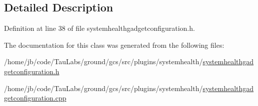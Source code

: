 \subsection{\-Detailed \-Description}


\-Definition at line 38 of file systemhealthgadgetconfiguration.\-h.



\-The documentation for this class was generated from the following files\-:\begin{DoxyCompactItemize}
\item 
/home/jb/code/\-Tau\-Labs/ground/gcs/src/plugins/systemhealth/\hyperlink{systemhealthgadgetconfiguration_8h}{systemhealthgadgetconfiguration.\-h}\item 
/home/jb/code/\-Tau\-Labs/ground/gcs/src/plugins/systemhealth/\hyperlink{systemhealthgadgetconfiguration_8cpp}{systemhealthgadgetconfiguration.\-cpp}\end{DoxyCompactItemize}
